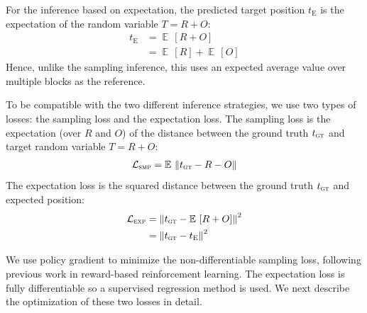\documentclass[letterpaper]{article} %
\DeclareMathOperator{\E}{\mathbb{E}\,}
\begin{document}
For the inference based on expectation, the predicted target position $t_\text{E}$ is the expectation of the random variable $T = R+O$:
\begin{align}
t_\text{E} & = \E\left[R + O\right] \\
  & = \E \left[R\right] + \E\left[O\right]
\end{align}
Hence, unlike the sampling inference, this uses an expected average value over multiple blocks as the reference.

To be compatible with the two different inference strategies, we use two types of losses: the sampling loss and the expectation loss.
The sampling loss is the expectation (over $R$ and $O$) of the distance between the ground truth $t_\textsc{gt}$ and target random variable $T = R+O$:
\begin{align}
\label{sampling loss}
\mathcal{L}_\textsc{smp}  = \E \left \Vert t_\textsc{gt} - R - O \right \Vert
\end{align}
The expectation loss is the squared distance between the ground truth $t_\textsc{gt}$ and expected position:
\begin{align}
\label{expectation loss}
\mathcal{L}_\textsc{exp} &=\left \Vert t_\textsc{gt} - \E\left[ R+O \right] \right \Vert^2\\
&= \left \Vert t_\textsc{gt} - t_\textsc{E} \right \Vert^2
\end{align}

We use policy gradient to minimize the non-differentiable sampling loss, following previous work in reward-based reinforcement learning.
The expectation loss is fully differentiable so a supervised regression method is used. We next describe the optimization of these two losses in detail.
\end{document}
